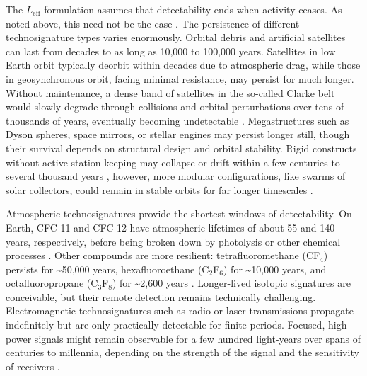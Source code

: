 The $L_{\mathrm{eff}}$ formulation assumes that detectability ends when activity ceases. As noted above, this need not be the case \citep{Balbi2021-bc}. The persistence of different technosignature types varies enormously. Orbital debris and artificial satellites can last from decades to as long as 10,000 to 100,000 years. Satellites in low Earth orbit typically deorbit within decades due to atmospheric drag, while those in geosynchronous orbit, facing minimal resistance, may persist for much longer. Without maintenance, a dense band of satellites in the so-called Clarke belt would slowly degrade through collisions and orbital perturbations over tens of thousands of years, eventually becoming undetectable \citep{Socas-Navarro2018-kg}. Megastructures such as Dyson spheres, space mirrors, or stellar engines may persist longer still, though their survival depends on structural design and orbital stability. Rigid constructs without active station-keeping may collapse or drift within a few centuries to several thousand years \citep{Wright2020-be}, however, more modular configurations, like swarms of solar collectors, could remain in stable orbits for far longer timescales \citep{Smith2022-ds}.

Atmospheric technosignatures provide the shortest windows of detectability. On Earth, CFC-11 and CFC-12 have atmospheric lifetimes of about 55 and 140 years, respectively, before being broken down by photolysis or other chemical processes \citep{NOAA-GML-lz}. Other compounds are more resilient: tetrafluoromethane (CF$_4$) persists for \textasciitilde50,000 years, hexafluoroethane (C$_2$F$_6$) for \textasciitilde10,000 years, and octafluoropropane (C$_3$F$_8$) for \textasciitilde2,600 years \citep{Trudinger2016-ky}. Longer-lived isotopic signatures are conceivable, but their remote detection remains technically challenging. Electromagnetic technosignatures such as radio or laser transmissions propagate indefinitely but are only practically detectable for finite periods. Focused, high-power signals might remain observable for a few hundred light-years over spans of centuries to millennia, depending on the strength of the signal and the sensitivity of receivers \citep{Sheikh2025-td}.

